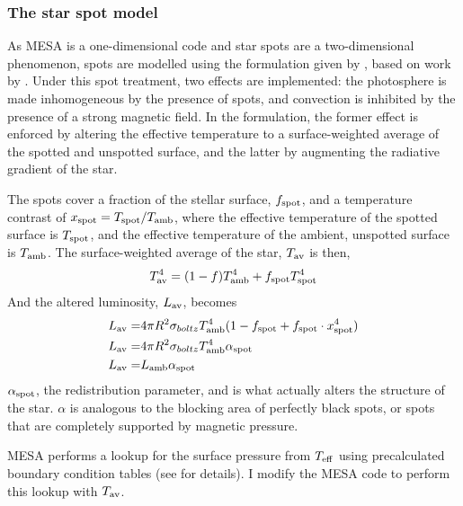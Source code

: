 \subsubsection{The star spot model}
\label{setc:modelling:star spot model description}

As MESA is a one-dimensional code and star spots are a two-dimensional phenomenon, spots are modelled using the formulation given by \citet{sommers2015}, based on work by \citet{spruit1986}.
Under this spot treatment, two effects are implemented: the photosphere is made inhomogeneous by the presence of spots, and convection is inhibited by the presence of a strong magnetic field.
In the \citet{sommers2015} formulation, the former effect is enforced by altering the effective temperature to a surface-weighted average of the spotted and unspotted surface, and the latter by augmenting the radiative gradient of the star.

The spots cover a fraction of the stellar surface, $f_{\rm spot}$, and a temperature contrast of $x_{\rm spot} = T_{\rm  spot} / T_{\rm amb}$, where the effective temperature of the spotted surface is $T_{\rm spot}$, and the effective temperature of the ambient, unspotted surface is $T_{\rm amb}$. The surface-weighted average of the star, $T_{\rm av}$ is then,
\begin{equation}
    \label{eqn:modelling:surface weighted average temp}
    T_{\rm av}^4 = (1-f) T_{\rm amb}^4 + f_{\rm spot} T_{\rm spot}^4
\end{equation}
And the altered luminosity, $L_{\rm av}$, becomes
\begin{align}
    L_{\rm av} =& 4\pi R^2 \sigma_{boltz} T_{\rm amb}^4 (1 - f_{\rm spot} + f_{\rm spot} \cdot x_{\rm spot}^4) \\
    L_{\rm av} =& 4\pi R^2 \sigma_{boltz} T_{\rm amb}^4 \alpha_{\rm spot} \\
    L_{\rm av} =& L_{\rm amb} \alpha_{\rm spot} \\
\end{align}
$\alpha_{\rm spot}$, the redistribution parameter, and is what actually alters the structure of the star. $\alpha$ is analogous to the blocking area of perfectly black spots, or spots that are completely supported by magnetic pressure.

MESA performs a lookup for the surface pressure from $T_{\rm eff}$ using precalculated boundary condition tables (see \citet{paxton2010,paxton2011} for details). I modify the MESA code to perform this lookup with $T_{\rm av}$.


